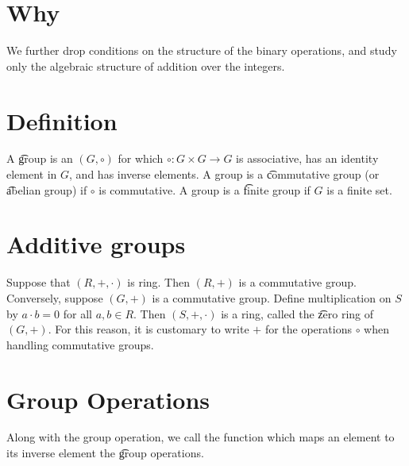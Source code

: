 
\section*{Why}

We further drop conditions on the structure of the binary operations, and study only the algebraic structure of addition over the integers.

\section*{Definition}

A \t{group} is an $(G, \circ)$ for which $\circ: G \times  G \to G$ is associative, has an identity element in $G$, and has inverse elements.
A group is a \t{commutative group} (or \t{abelian group}) if $\circ$ is commutative.
A group is a \t{finite group} if $G$ is a finite set.

\section*{Additive groups}

Suppose that $(R, +, \cdot )$ is ring.
Then $(R, +)$ is a commutative group.
Conversely, suppose $(G, +)$ is a commutative group.
Define multiplication on $S$ by $a\cdot b = 0$ for all $a, b \in R$.
Then $(S, +, \cdot )$ is a ring, called the \t{zero ring} of $(G, +)$.
For this reason, it is customary to write $+$ for the operations $\circ$ when handling commutative groups.

\section*{Group Operations}

Along with the group operation, we call the function which maps an element to its inverse element the \t{group operations}.

\blankpage